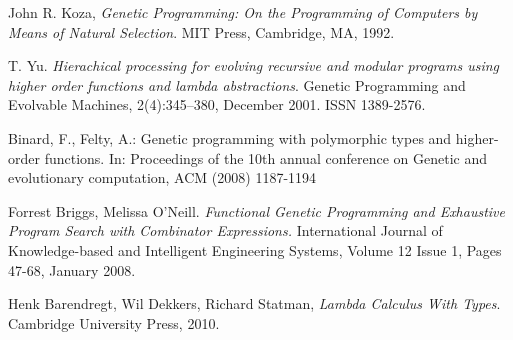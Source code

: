 \documentclass{article}
\begin{document}
\begin{thebibliography}{1}


  John R. Koza,
  \emph{Genetic Programming: On the Programming of Computers by Means of Natural Selection}.
  MIT Press, Cambridge, MA,
  1992. 

  T. Yu. 
  \emph{Hierachical processing for evolving recursive and modular 
        programs using higher order functions and lambda abstractions}. 
  Genetic Programming and Evolvable Machines,
  2(4):345–380, December 2001. ISSN 1389-2576.

Binard, F., Felty, A.: Genetic programming with polymorphic types and higher-order 
functions. In: Proceedings of the 10th annual conference on Genetic and
evolutionary computation, ACM (2008) 1187-1194

Forrest Briggs, Melissa O’Neill.
\emph{Functional Genetic Programming and Exhaustive
Program Search with Combinator Expressions.}
International Journal of Knowledge-based and Intelligent Engineering Systems,
Volume 12 Issue 1, Pages 47-68, January 2008. 


  Henk Barendregt, Wil Dekkers, Richard Statman,
  \emph{Lambda Calculus With Types}.
  Cambridge University Press,
  2010. 


\end{thebibliography}
\end{document}
